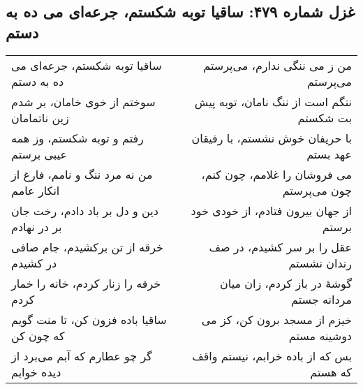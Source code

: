 \begin{center}
\section*{غزل شماره ۴۷۹: ساقیا توبه شکستم، جرعه‌ای می ده به دستم}
\label{sec:479}
\begin{longtable}{l p{0.5cm} r}
ساقیا توبه شکستم، جرعه‌ای می ده به دستم
&&
من ز می ننگی ندارم، می‌پرستم می‌پرستم
\\
سوختم از خوی خامان، بر شدم زین ناتمامان
&&
ننگم است از ننگ نامان، توبه پیش بت شکستم
\\
رفتم و توبه شکستم، وز همه عیبی برستم
&&
با حریفان خوش نشستم، با رفیقان عهد بستم
\\
من نه مرد ننگ و نامم، فارغ از انکار عامم
&&
می فروشان را غلامم، چون کنم، چون می‌پرستم
\\
دین و دل بر باد دادم، رخت جان بر در نهادم
&&
از جهان بیرون فتادم، از خودی خود برستم
\\
خرقه از تن برکشیدم، جام صافی در کشیدم
&&
عقل را بر سر کشیدم، در صف رندان نشستم
\\
خرقه را زنار کردم، خانه را خمار کردم
&&
گوشهٔ در باز کردم، زان میان مردانه جستم
\\
ساقیا باده فزون کن، تا منت گویم که چون کن
&&
خیزم از مسجد برون کن، کز می دوشینه مستم
\\
گر چو عطارم که آبم می‌برد از دیده خوابم
&&
بس که از باده خرابم، نیستم واقف که هستم
\\
\end{longtable}
\end{center}
